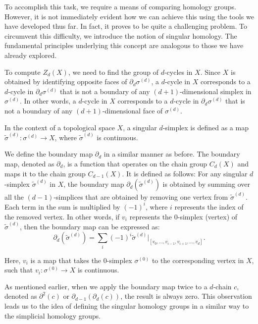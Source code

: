 To accomplish this task, we require a means of comparing homology groups. However, it is not immediately evident how we can achieve this using the tools we have developed thus far. In fact, it proves to be quite a challenging problem. To circumvent this difficulty, we introduce the notion of singular homology. The fundamental principles underlying this concept are analogous to those we have already explored.

To compute $Z_d(X)$, we need to find the group of $d$-cycles in $X$. Since $X$ is obtained by identifying opposite faces of $\partial_d \sigma^{(d)}$, a $d$-cycle in $X$ corresponds to a $d$-cycle in $\partial_d \sigma^{(d)}$ that is not a boundary of any $(d+1)$-dimensional simplex in $\sigma^{(d)}$. In other words, a $d$-cycle in $X$ corresponds to a $d$-cycle in $\partial_d \sigma^{(d)}$ that is not a boundary of any $(d+1)$-dimensional face of $\sigma^{(d)}$.

\begin{definition}
    In the context of a topological space $X$, a singular $d$-simplex is defined as a map $\tilde{\sigma}^{(d)}: \sigma^{(d)} \to X$, where $\tilde{\sigma}^{(d)}$ is continuous.
\end{definition}

We define the boundary map $\partial_d$ in a similar manner as before. The boundary map, denoted as $\partial_d$, is a function that operates on the chain group $C_d(X)$ and maps it to the chain group $C_{d-1}(X)$. It is defined as follows: For any singular $d$-simplex $\tilde{\sigma}^{(d)}$ in $X$, the boundary map $\partial_d(\tilde{\sigma}^{(d)})$ is obtained by summing over all the $(d-1)$-simplices that are obtained by removing one vertex from $\tilde{\sigma}^{(d)}$. Each term in the sum is multiplied by $(-1)^i$, where $i$ represents the index of the removed vertex. In other words, if $v_i$ represents the $0$-simplex (vertex) of $\tilde{\sigma}^{(d)}$, then the boundary map can be expressed as:
\begin{equation}
    \partial_d(\tilde{\sigma}^{(d)}) = \sum_{i} (-1)^i \tilde{\sigma}^{(d)}\vert_{[v_0, \ldots, v_{i-1}, v_{i+1}, \ldots, v_d]}.
\end{equation}

Here, $v_i$ is a map that takes the $0$-simplex $\sigma^{(0)}$ to the corresponding vertex in $X$, such that $v_i: \sigma^{(0)} \to X$ is continuous.

As mentioned earlier, when we apply the boundary map twice to a $d$-chain $c$, denoted as $\partial^2(c)$ or $\partial_{d-1}(\partial_d(c))$, the result is always zero. This observation leads us to the idea of defining the singular homology groups in a similar way to the simplicial homology groups.

